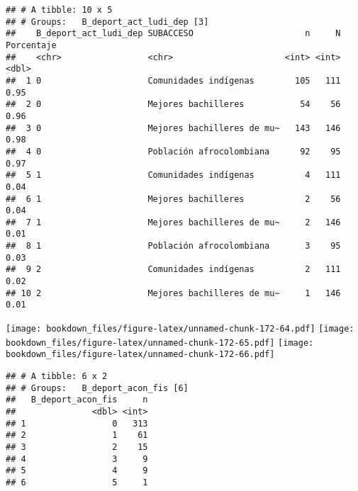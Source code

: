 \documentclass[]{article}
\theoremstyle{definition}
\theoremstyle{definition}
\theoremstyle{definition}
\theoremstyle{remark}
\begin{document}
\begin{verbatim}
## # A tibble: 10 x 5
## # Groups:   B_deport_act_ludi_dep [3]
##    B_deport_act_ludi_dep SUBACCESO                      n     N Porcentaje
##    <chr>                 <chr>                      <int> <int>      <dbl>
##  1 0                     Comunidades indígenas        105   111       0.95
##  2 0                     Mejores bachilleres           54    56       0.96
##  3 0                     Mejores bachilleres de mu~   143   146       0.98
##  4 0                     Población afrocolombiana      92    95       0.97
##  5 1                     Comunidades indígenas          4   111       0.04
##  6 1                     Mejores bachilleres            2    56       0.04
##  7 1                     Mejores bachilleres de mu~     2   146       0.01
##  8 1                     Población afrocolombiana       3    95       0.03
##  9 2                     Comunidades indígenas          2   111       0.02
## 10 2                     Mejores bachilleres de mu~     1   146       0.01
\end{verbatim}

\texttt{[image: bookdown\_files/figure-latex/unnamed-chunk-172-64.pdf]}
\texttt{[image: bookdown\_files/figure-latex/unnamed-chunk-172-65.pdf]}
\texttt{[image: bookdown\_files/figure-latex/unnamed-chunk-172-66.pdf]}

\begin{verbatim}
## # A tibble: 6 x 2
## # Groups:   B_deport_acon_fis [6]
##   B_deport_acon_fis     n
##               <dbl> <int>
## 1                 0   313
## 2                 1    61
## 3                 2    15
## 4                 3     9
## 5                 4     9
## 6                 5     1
\end{verbatim}
\end{document}
